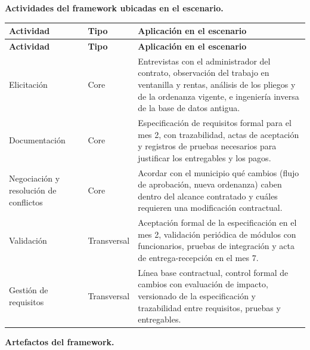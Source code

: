 \textbf{Actividades del framework ubicadas en el escenario.}

{\small
\setlength{\tabcolsep}{4pt}
\renewcommand{\arraystretch}{1.3}
\begin{longtable}{
|>{\raggedright\arraybackslash}p{}
|>{\raggedright\arraybackslash}p{}
|>{\raggedright\arraybackslash}p{}|}
\hline
\textbf{Actividad} & \textbf{Tipo} & \textbf{Aplicación en el escenario} \\
\hline
\endfirsthead
\hline
\textbf{Actividad} & \textbf{Tipo} & \textbf{Aplicación en el escenario} \\
\hline
\endhead
Elicitación & Core & Entrevistas con el administrador del contrato, observación del trabajo en ventanilla y rentas, análisis de los pliegos y de la ordenanza vigente, e ingeniería inversa de la base de datos antigua. \\
\hline
Documentación & Core & Especificación de requisitos formal para el mes 2, con trazabilidad, actas de aceptación y registros de pruebas necesarios para justificar los entregables y los pagos. \\
\hline
Negociación y resolución de conflictos & Core & Acordar con el municipio qué cambios (flujo de aprobación, nueva ordenanza) caben dentro del alcance contratado y cuáles requieren una modificación contractual. \\
\hline
Validación & Transversal & Aceptación formal de la especificación en el mes 2, validación periódica de módulos con funcionarios, pruebas de integración y acta de entrega-recepción en el mes 7. \\
\hline
Gestión de requisitos & Transversal & Línea base contractual, control formal de cambios con evaluación de impacto, versionado de la especificación y trazabilidad entre requisitos, pruebas y entregables. \\
\hline
\end{longtable}
}

\textbf{Artefactos del framework.}

